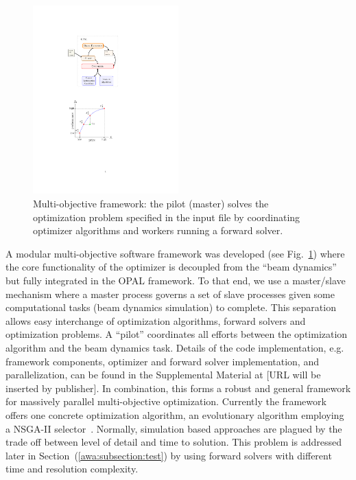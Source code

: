 \documentclass[preprint,linenumbers,amsmath,amssymb,aps,prstab]{revtex4-1}%
\begin{document}
\begin{figure}%
	\center
\includegraphics[width=0.5\textwidth]{opt-framework_code}
\caption{Multi-objective framework: the pilot (master) solves the
	optimization problem specified in the input file by coordinating optimizer
	algorithms and workers running a forward solver.}
\label{fig:framenetwork}
\end{figure}

A modular multi-objective software framework was developed (see
 Fig.~\ref{fig:framenetwork}) where the core functionality of the optimizer is decoupled from
 the ``beam dynamics'' but fully integrated in the OPAL framework. 
To that end, we use a master/slave mechanism where a master process governs a
 set of slave processes given some computational tasks (beam dynamics simulation) to complete.
This separation allows easy interchange of optimization algorithms, forward
  solvers and optimization problems.
A ``pilot'' coordinates all efforts between the optimization algorithm and the
  beam dynamics task. Details of the code implementation, e.g. framework components, 
  optimizer and forward solver implementation, and parallelization, can be found in the 
  Supplemental Material at [URL will be inserted by publisher].
In combination, this forms a robust and general framework for massively parallel
  multi-objective optimization.
Currently the framework offers one concrete optimization algorithm, an
  evolutionary algorithm employing a \textsc{NSGA-II} selector~\cite{dpam:02,pisa}.
Normally, simulation based approaches are plagued by the trade off between
  level of detail and time to solution.
This problem is addressed later in Section~(\ref{awa:subsection:test}) by using forward solvers with different time and resolution complexity.
\end{document}
